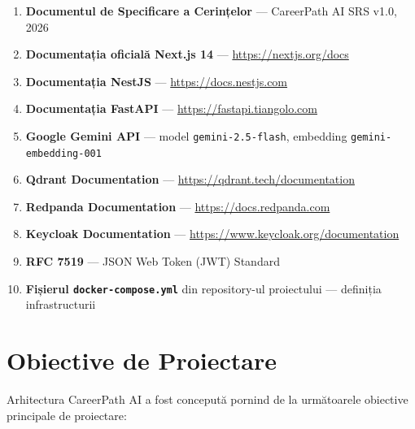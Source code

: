 \documentclass[12pt, a4paper]{report}
\begin{document}
\begin{enumerate}[leftmargin=*]
  \item \textbf{Documentul de Specificare a Cerințelor} — CareerPath AI SRS v1.0, 2026
  \item \textbf{Documentația oficială Next.js 14} — \url{https://nextjs.org/docs}
  \item \textbf{Documentația NestJS} — \url{https://docs.nestjs.com}
  \item \textbf{Documentația FastAPI} — \url{https://fastapi.tiangolo.com}
  \item \textbf{Google Gemini API} — model \texttt{gemini-2.5-flash}, embedding \texttt{gemini-embedding-001}
  \item \textbf{Qdrant Documentation} — \url{https://qdrant.tech/documentation}
  \item \textbf{Redpanda Documentation} — \url{https://docs.redpanda.com}
  \item \textbf{Keycloak Documentation} — \url{https://www.keycloak.org/documentation}
  \item \textbf{RFC 7519} — JSON Web Token (JWT) Standard
  \item \textbf{Fișierul \texttt{docker-compose.yml}} din repository-ul proiectului — definiția infrastructurii
\end{enumerate}

\chapter{Obiective de Proiectare}

Arhitectura CareerPath AI a fost concepută pornind de la următoarele obiective principale
de proiectare:
\end{document}
